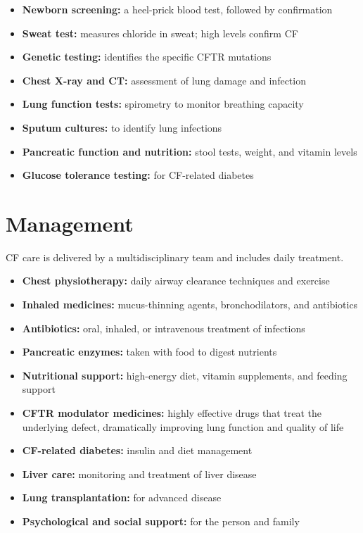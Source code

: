 \begin{itemize}
    \item \textbf{Newborn screening:} a heel-prick blood test, followed by confirmation
    \item \textbf{Sweat test:} measures chloride in sweat; high levels confirm CF
    \item \textbf{Genetic testing:} identifies the specific CFTR mutations
    \item \textbf{Chest X-ray and CT:} assessment of lung damage and infection
    \item \textbf{Lung function tests:} spirometry to monitor breathing capacity
    \item \textbf{Sputum cultures:} to identify lung infections
    \item \textbf{Pancreatic function and nutrition:} stool tests, weight, and vitamin levels
    \item \textbf{Glucose tolerance testing:} for CF-related diabetes
\end{itemize}

\section*{Management}
CF care is delivered by a multidisciplinary team and includes daily treatment.

\begin{itemize}
    \item \textbf{Chest physiotherapy:} daily airway clearance techniques and exercise
    \item \textbf{Inhaled medicines:} mucus-thinning agents, bronchodilators, and antibiotics
    \item \textbf{Antibiotics:} oral, inhaled, or intravenous treatment of infections
    \item \textbf{Pancreatic enzymes:} taken with food to digest nutrients
    \item \textbf{Nutritional support:} high-energy diet, vitamin supplements, and feeding support
    \item \textbf{CFTR modulator medicines:} highly effective drugs that treat the underlying defect, dramatically improving lung function and quality of life
    \item \textbf{CF-related diabetes:} insulin and diet management
    \item \textbf{Liver care:} monitoring and treatment of liver disease
    \item \textbf{Lung transplantation:} for advanced disease
    \item \textbf{Psychological and social support:} for the person and family
\end{itemize}

